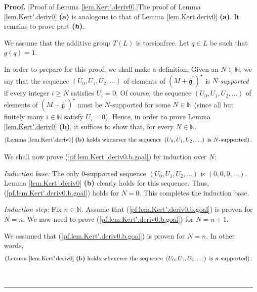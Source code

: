 \documentclass[numbers=enddot,12pt,final,onecolumn,notitlepage]{scrartcl}%
\theoremstyle{definition}
\newenvironment{proof}[1][Proof]{\noindent\textbf{#1.} }{\ \rule{0.5em}{0.5em}}
\begin{document}
\begin{proof}
[Proof of Lemma \ref{lem.Kert'.deriv0}.]The proof of Lemma
\ref{lem.Kert'.deriv0} \textbf{(a)} is analogous to that of Lemma
\ref{lem.Kert.deriv0} \textbf{(a)}. It remains to prove part \textbf{(b)}.

We assume that the additive group $T\left(  L\right)  $ is torsionfree. Let
$q\in L$ be such that $g\left(  q\right)  =1$.

In order to prepare for this proof, we shall make a definition. Given an
$N\in\mathbb{N}$, we say that the sequence $\left(  U_{0},U_{1},U_{2}%
,\ldots\right)  $ of elements of $\left(  M+\overline{\mathfrak{g}}^{\prime
}\right)  ^{\star}$ is $N$\textit{-supported} if every integer $i\geq N$
satisfies $U_{i}=0$. Of course, the sequence $\left(  U_{0},U_{1},U_{2}%
,\ldots\right)  $ of elements of $\left(  M+\overline{\mathfrak{g}}^{\prime
}\right)  ^{\star}$ must be $N$-supported for some $N\in\mathbb{N}$ (since all
but finitely many $i\in\mathbb{N}$ satisfy $U_{i}=0$). Hence, in order to
prove Lemma \ref{lem.Kert'.deriv0} \textbf{(b)}, it suffices to show that, for
every $N\in\mathbb{N}$,%
\begin{equation}
\left(  \text{Lemma \ref{lem.Kert'.deriv0} \textbf{(b)} holds whenever the
sequence }\left(  U_{0},U_{1},U_{2},\ldots\right)  \text{ is }%
N\text{-supported}\right)  . \label{pf.lem.Kert'.deriv0.b.goal}%
\end{equation}


We shall now prove (\ref{pf.lem.Kert'.deriv0.b.goal}) by induction over $N$:

\textit{Induction base:} The only $0$-supported sequence $\left(  U_{0}%
,U_{1},U_{2},\ldots\right)  $ is $\left(  0,0,0,\ldots\right)  $. Lemma
\ref{lem.Kert'.deriv0} \textbf{(b)} clearly holds for this sequence. Thus,
(\ref{pf.lem.Kert'.deriv0.b.goal}) holds for $N=0$. This completes the
induction base.

\textit{Induction step:} Fix $n\in\mathbb{N}$. Assume that
(\ref{pf.lem.Kert'.deriv0.b.goal}) is proven for $N=n$. We now need to prove
(\ref{pf.lem.Kert'.deriv0.b.goal}) for $N=n+1$.

We assumed that (\ref{pf.lem.Kert'.deriv0.b.goal}) is proven for $N=n$. In
other words,%
\begin{equation}
\left(  \text{Lemma \ref{lem.Kert'.deriv0} \textbf{(b)} holds whenever the
sequence }\left(  U_{0},U_{1},U_{2},\ldots\right)  \text{ is }%
n\text{-supported}\right)  . \label{pf.lem.Kert'.deriv0.b.indhyp}%
\end{equation}



\end{proof}
\end{document}
